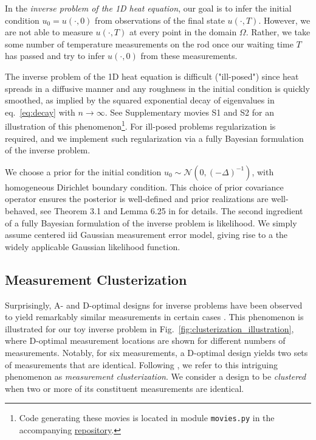 In the \emph{inverse problem of the 1D heat equation}, our goal is to
infer the initial condition $u_0 = u(\cdot, 0)$ from observations of
the final state $u(\cdot, T)$. However, we are not able to measure
$u(\cdot, T)$ at every point in the domain $\Omega$. Rather, we take
some number of temperature measurements on the rod once our waiting
time $T$ has passed and try to infer $u(\cdot, 0)$ from these
measurements.

The inverse problem of the 1D heat equation is difficult ("ill-posed")
since heat spreads in a diffusive manner and any roughness in the
initial condition is quickly smoothed, as implied by the squared
exponential decay of eigenvalues in eq.~\eqref{eq:decay} with
$n\to\infty$. See Supplementary movies S1 and S2 for an illustration
of this phenomenon\footnote{Code generating these movies is located in
module \texttt{movies.py} in the accompanying
\href{https://github.com/yairdaon/OED}{repository}.}. For ill-posed
problems regularization is required, and we implement such
regularization via a fully Bayesian formulation of the inverse
problem.

We choose a prior for the initial condition $u_0 \sim \mathcal{N}(0,
(-\Delta)^{-1})$, with homogeneous Dirichlet boundary condition. This
choice of prior covariance operator ensures the posterior is
well-defined and prior realizations are well-behaved, see Theorem 3.1
and Lemma 6.25 in \cite{Stuart10} for details. The second ingredient of a
fully Bayesian formulation of the inverse problem is likelihood. We
simply assume centered iid Gaussian measurement error model, giving
rise to a the widely applicable Gaussian likelihood function.


\subsection{Measurement Clusterization}
Surprisingly, A- and D-optimal designs for inverse problems have been
observed to yield remarkably similar measurements in certain cases
\cite{fedorovDesignSpatialExperiments1996, nyberg2012, fedorov1997,
  Ucinski05, neitzel2019sparse}. This phenomenon is illustrated for
our toy inverse problem in Fig.~\ref{fig:clusterization_illustration},
where D-optimal measurement locations are shown for different numbers
of measurements. Notably, for six measurements, a D-optimal design
yields two sets of measurements that are identical. Following
\cite{Ucinski05}, we refer to this intriguing phenomenon as
\emph{measurement clusterization}. We consider a design to be
\emph{clustered} when two or more of its constituent measurements are
identical.

